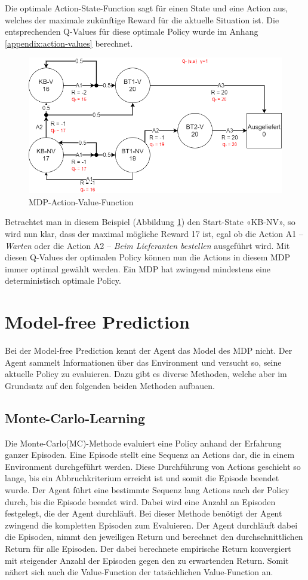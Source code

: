 \newpage
Die optimale Action-State-Function sagt für einen State und eine Action aus, welches der maximale zukünftige Reward für die aktuelle Situation ist. Die entsprechenden Q-Values für diese optimale Policy wurde im Anhang \ref{appendix:action-values} berechnet.
 \begin{figure}[H]
  \centering
  \includegraphics[width=\textwidth]{img/MDP_Action-Value_Function.png}
  \caption{MDP-Action-Value-Function}
      \label{fig:mdp-action-value}
\end{figure}

Betrachtet man in diesem Beispiel (Abbildung \ref{fig:mdp-action-value}) den Start-State «KB-NV», so wird nun klar, dass der maximal mögliche Reward 17 ist, egal ob die Action A1 – \emph{Warten} oder die Action A2 – \emph{Beim Lieferanten bestellen} ausgeführt wird. Mit diesen Q-Values der optimalen Policy können nun die Actions in diesem MDP immer optimal gewählt werden. Ein MDP hat zwingend mindestens eine deterministisch optimale Policy.


\section{Model-free Prediction}
Bei der Model-free Prediction kennt der Agent das Model des MDP nicht. Der Agent sammelt Informationen über das Environment und versucht so, seine aktuelle Policy zu evaluieren. Dazu gibt es diverse Methoden, welche aber im Grundsatz auf den folgenden beiden Methoden aufbauen.
\subsection{Monte-Carlo-Learning}
Die Monte-Carlo(MC)-Methode evaluiert eine Policy anhand der Erfahrung ganzer Episoden. Eine Episode stellt eine Sequenz an Actions dar, die in einem Environment durchgeführt werden. Diese Durchführung von Actions geschieht so lange, bis ein Abbruchkriterium erreicht ist und somit die Episode beendet wurde. Der Agent führt eine bestimmte Sequenz lang Actions nach der Policy durch, bis die Episode beendet wird. Dabei wird eine Anzahl an Episoden festgelegt, die der Agent durchläuft. Bei dieser Methode benötigt der Agent zwingend die kompletten Episoden zum Evaluieren. Der Agent durchläuft dabei die Episoden, nimmt den jeweiligen Return und berechnet den durchschnittlichen Return für alle Episoden. Der dabei berechnete empirische Return konvergiert mit steigender Anzahl der Episoden gegen den zu erwartenden Return. Somit nähert sich auch die Value-Function der tatsächlichen Value-Function an.
